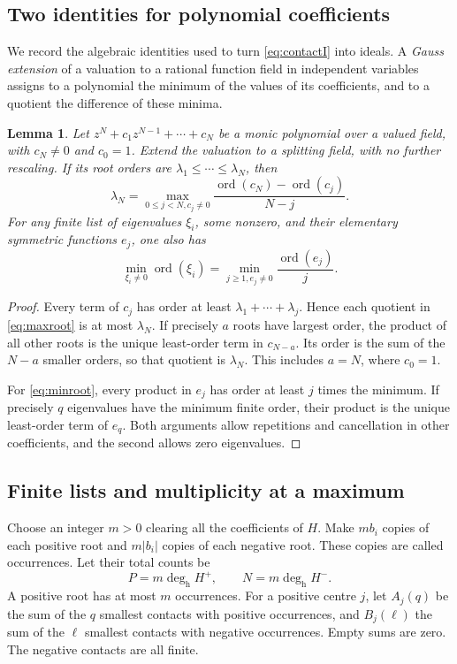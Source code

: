 \documentclass[11pt,reqno]{amsart}
\numberwithin{equation}{section}
\newtheorem{lemma}[theorem]{Lemma}
\theoremstyle{definition}
\theoremstyle{remark}
\newcommand{\ord}{\operatorname{ord}}
\newcommand{\degh}{\deg_{\mathrm h}}
\begin{document}
\subsection{Two identities for polynomial coefficients}
We record the algebraic identities used to turn \eqref{eq:contactI} into ideals. A \emph{Gauss extension} of a valuation to a rational function field in independent variables assigns to a polynomial the minimum of the values of its coefficients, and to a quotient the difference of these minima.

\begin{lemma}\label{lem:polynomial}
Let $z^N+c_1z^{N-1}+\cdots+c_N$ be a monic polynomial over a valued field, with $c_N\ne0$ and $c_0=1$. Extend the valuation to a splitting field, with no further rescaling. If its root orders are $\lambda_1\le\cdots\le\lambda_N$, then
\begin{equation}\label{eq:maxroot}
 \lambda_N=\max_{0\le j<N, c_j\ne0}
 \frac{\ord(c_N)-\ord(c_j)}{N-j}.
\end{equation}
For any finite list of eigenvalues $\xi_i$, some nonzero, and their elementary symmetric functions $e_j$, one also has
\begin{equation}\label{eq:minroot}
 \min_{\xi_i\ne0}\ord(\xi_i)
 =\min_{j\ge1, e_j\ne0}\frac{\ord(e_j)}j.
\end{equation}
\end{lemma}
\begin{proof}
Every term of $c_j$ has order at least $\lambda_1+\cdots+\lambda_j$. Hence each quotient in \eqref{eq:maxroot} is at most $\lambda_N$. If precisely $a$ roots have largest order, the product of all other roots is the unique least-order term in $c_{N-a}$. Its order is the sum of the $N-a$ smaller orders, so that quotient is $\lambda_N$. This includes $a=N$, where $c_0=1$.

For \eqref{eq:minroot}, every product in $e_j$ has order at least $j$ times the minimum. If precisely $q$ eigenvalues have the minimum finite order, their product is the unique least-order term of $e_q$. Both arguments allow repetitions and cancellation in other coefficients, and the second allows zero eigenvalues.
\end{proof}

\subsection{Finite lists and multiplicity at a maximum}
Choose an integer $m>0$ clearing all the coefficients of $H$. Make $mb_i$ copies of each positive root and $m|b_i|$ copies of each negative root. These copies are called occurrences. Let their total counts be
\[
 P=m\degh H^+,\qquad N=m\degh H^-.
\]
A positive root has at most $m$ occurrences. For a positive centre $j$, let $A_j(q)$ be the sum of the $q$ smallest contacts with positive occurrences, and $B_j(\ell)$ the sum of the $\ell$ smallest contacts with negative occurrences. Empty sums are zero. The negative contacts are all finite.
\end{document}
